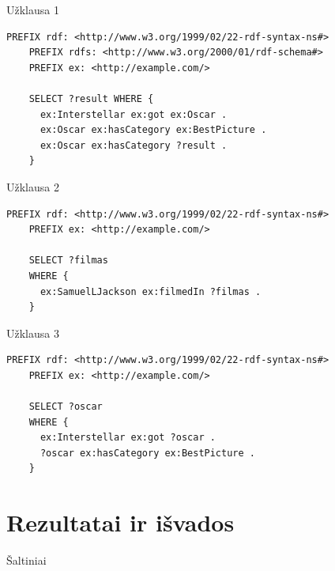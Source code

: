 \documentclass[10pt]{beamer}
\begin{document}
\begin{frame}[fragile]{Užklausa 1}
    \begin{lstlisting}[captionpos=b, caption=Ar Christopherio Nolano filmas "Interstellar" gavo Oscar už nominacija best picture?, label=lst:sparql,
       basicstyle=\ttfamily\scriptsize,frame=single]
    PREFIX rdf: <http://www.w3.org/1999/02/22-rdf-syntax-ns#>
    PREFIX rdfs: <http://www.w3.org/2000/01/rdf-schema#>
    PREFIX ex: <http://example.com/>
    
    SELECT ?result WHERE {
      ex:Interstellar ex:got ex:Oscar .
      ex:Oscar ex:hasCategory ex:BestPicture .
      ex:Oscar ex:hasCategory ?result .
    }
    \end{lstlisting}
\end{frame}

\begin{frame}[fragile]{Užklausa 2}
    \begin{lstlisting}[captionpos=b, caption=Kokiame filme vaidino Samuel L. Jackson?, label=lst:sparql,
       basicstyle=\ttfamily\scriptsize,frame=single]
    PREFIX rdf: <http://www.w3.org/1999/02/22-rdf-syntax-ns#>
    PREFIX ex: <http://example.com/>
    
    SELECT ?filmas
    WHERE {
      ex:SamuelLJackson ex:filmedIn ?filmas .
    }
    \end{lstlisting}
\end{frame}

\begin{frame}[fragile]{Užklausa 3}
    \begin{lstlisting}[captionpos=b, caption=Ar Christopherio Nolano filmas "Interstellar" gavo Oscar?, label=lst:sparql,
       basicstyle=\ttfamily\scriptsize,frame=single]
    PREFIX rdf: <http://www.w3.org/1999/02/22-rdf-syntax-ns#>
    PREFIX ex: <http://example.com/>
    
    SELECT ?oscar
    WHERE {
      ex:Interstellar ex:got ?oscar .
      ?oscar ex:hasCategory ex:BestPicture .
    }
    \end{lstlisting}
\end{frame}

\section{Rezultatai ir išvados}

\begin{frame}[allowframebreaks]{Šaltiniai}
  \printbibliography[heading=none]
\end{frame}
\end{document}
